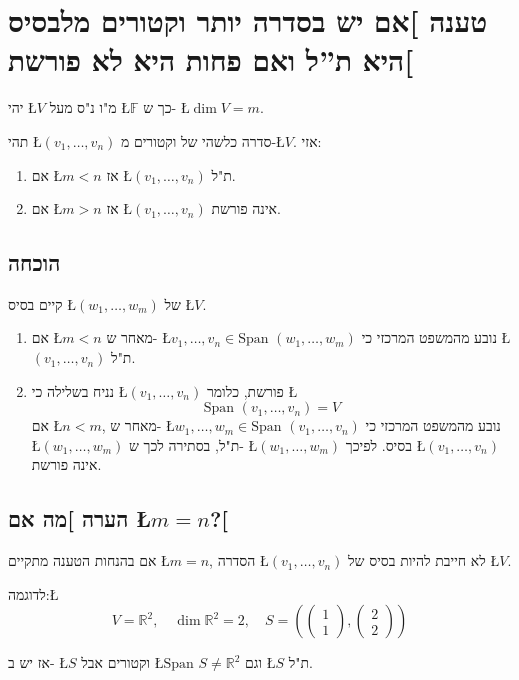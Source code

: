 \documentclass[english,hebrew]{article}
\newcommand{\spn}{\text{Span }}
\begin{document}
\section{טענה {]}אם יש בסדרה יותר וקטורים מלבסיס היא ת\textquotedblright ל
ואם פחות היא לא פורשת{[}}

יהי \L{$V$} מ"ו נ"ס מעל \L{$\mathbb{F}$} כך ש- \L{$\dim V=m$}.

תהי \L{$(v_{1},\dots,v_{n})$} סדרה כלשהי של וקטורים מ-\L{$V$}. אזי: 
\begin{enumerate}
\item אם \L{$m<n$} אז \L{$(v_{1},\dots,v_{n})$} ת"ל. 
\item אם \L{$m>n$} אז \L{$(v_{1},\dots,v_{n})$} אינה פורשת. 
\end{enumerate}

\subsection{הוכחה}

קיים בסיס \L{$(w_{1},\dots,w_{m})$} של \L{$V$}. 
\begin{enumerate}
\item אם \L{$m<n$} מאחר ש- \L{$v_{1},\dots,v_{n}\in\spn(w_{1},\dots,w_{m})$}
נובע מהמשפט המרכזי כי \L{$(v_{1},\dots,v_{n})$} ת"ל. 
\item נניח בשלילה כי \L{$(v_{1},\dots,v_{n})$} פורשת, כלומר \L{%
\[
\spn(v_{1},\dots,v_{n})=V
\]
}%
אם \L{$n<m$}, מאחר ש- \L{$w_{1},\dots,w_{m}\in\spn(v_{1},\dots,v_{n})$}
נובע מהמשפט המרכזי כי \L{$(w_{1},\dots,w_{m})$} ת"ל, בסתירה לכך
ש- \L{$(w_{1},\dots,w_{m})$} בסיס. לפיכך \L{$(v_{1},\dots,v_{n})$}
אינה פורשת. 
\end{enumerate}

\subsection{הערה {]}מה אם \L{$m=n$}?{[}}

אם בהנחות הטענה מתקיים \L{$m=n$}, הסדרה \L{$(v_{1},\dots,v_{n})$}
לא חייבת להיות בסיס של \L{$V$}.

לדוגמה:\L{%
\[
V=\mathbb{R}^{2},\quad\dim\mathbb{R}^{2}=2,\quad S=\left(\begin{pmatrix}1\\
1
\end{pmatrix},\begin{pmatrix}2\\
2
\end{pmatrix}\right)
\]
}%

אז יש ב- \L{$S$} {\endL} וקטורים אבל \L{$\spn S\neq\mathbb{R}^{2}$}
וגם \L{$S$} ת"ל.
\end{document}
